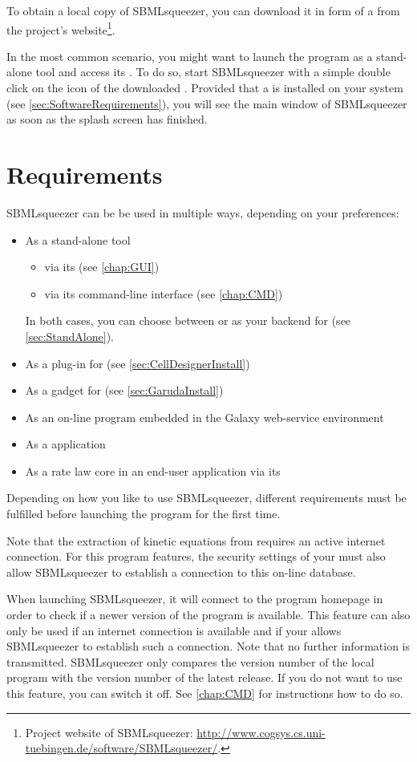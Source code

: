 To obtain a local copy of SBMLsqueezer, you can download it in form of a 
\JAR from the project's website\footnote{Project website of SBMLsqueezer: \url{http://www.cogsys.cs.uni-tuebingen.de/software/SBMLsqueezer/}.}.

In the most common scenario, you might want to launch the program as a
stand-alone tool and access its \GUI. To do so,
start SBMLsqueezer with a simple double click on the icon of the downloaded
\JAR.
Provided that a \JVM is installed on your system 
(see \vref{sec:SoftwareRequirements}), you will see the main window of
SBMLsqueezer as soon as the splash screen has finished.

\section{Requirements}

SBMLsqueezer can be be used in multiple ways, depending on your preferences:
\begin{itemize}
  \item As a stand-alone tool
  \begin{itemize}
    \item via its \GUI (see \vref{chap:GUI})
    \item via its command-line interface (see \vref{chap:CMD})
  \end{itemize}
        In both cases, you can choose between \JSBML or \libSBML as your backend
        for \SBML (see \vref{sec:StandAlone}).
  \item As a plug-in for \CellDesigner (see \vref{sec:CellDesignerInstall})
  \item As a gadget for \Garuda (see \vref{sec:GarudaInstall})
  \item As an on-line program embedded in the Galaxy web-service environment \citet{Goecks2010}
  \item As a \JavaWebStart application
  \item As a rate law core in an end-user application via its \API
\end{itemize}
Depending on how you like to use SBMLsqueezer, different requirements must be
fulfilled before launching the program for the first time.

Note that the extraction of kinetic equations from \SABIO requires an active internet connection.
For this program features, the security settings of your \OS must also allow SBMLsqueezer to establish a connection to this on-line database.

When launching SBMLsqueezer, it will connect to the program homepage in order to check if a newer version of the program is available.
This feature can also only be used if an internet connection is available and if your \OS allows SBMLsqueezer to establish such a connection.
Note that no further information is transmitted.
SBMLsqueezer only compares the version number of the local program with the version number of the latest release.
If you do not want to use this feature, you can switch it off.
See \vref{chap:CMD} for instructions how to do so.

